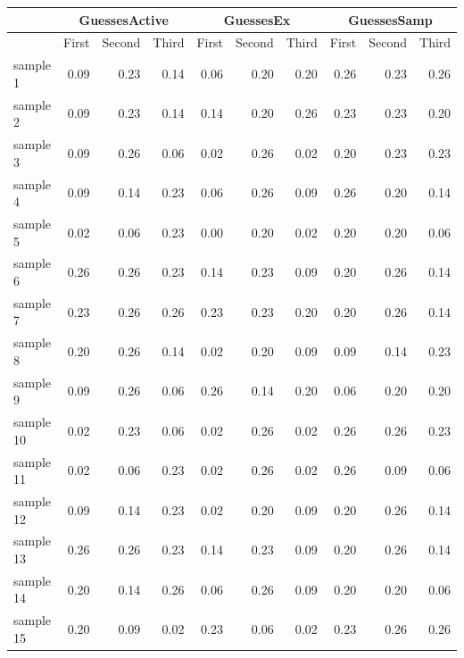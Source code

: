 \begin{table}
\begin{tabular}{|l|rrr|rrr|rrr|}
\toprule
& \multicolumn{3}{c|}{GuessesActive} & \multicolumn{3}{c|}{GuessesEx} & \multicolumn{3}{c|}{GuessesSamp} \\
\midrule
 &             First &     Second &     Third &   First &     Second &     Third &     First &     Second &  Third \\
\midrule
sample 1  &          0.09 &  0.23 &  0.14 &      0.06 &  0.20 &  0.20 &        0.26 &  0.23 &  0.26 \\
sample 2  &          0.09 &  0.23 &  0.14 &      0.14 &  0.20 &  0.26 &        0.23 &  0.23 &  0.20 \\
sample 3  &          0.09 &  0.26 &  0.06 &      0.02 &  0.26 &  0.02 &        0.20 &  0.23 &  0.23 \\
sample 4  &          0.09 &  0.14 &  0.23 &      0.06 &  0.26 &  0.09 &        0.26 &  0.20 &  0.14 \\
sample 5  &          0.02 &  0.06 &  0.23 &      0.00 &  0.20 &  0.02 &        0.20 &  0.20 &  0.06 \\
sample 6  &          0.26 &  0.26 &  0.23 &      0.14 &  0.23 &  0.09 &        0.20 &  0.26 &  0.14 \\
sample 7  &          0.23 &  0.26 &  0.26 &      0.23 &  0.23 &  0.20 &        0.20 &  0.26 &  0.14 \\
sample 8  &          0.20 &  0.26 &  0.14 &      0.02 &  0.20 &  0.09 &        0.09 &  0.14 &  0.23 \\
sample 9  &          0.09 &  0.26 &  0.06 &      0.26 &  0.14 &  0.20 &        0.06 &  0.20 &  0.20 \\
sample 10 &          0.02 &  0.23 &  0.06 &      0.02 &  0.26 &  0.02 &        0.26 &  0.26 &  0.23 \\
sample 11 &          0.02 &  0.06 &  0.23 &      0.02 &  0.26 &  0.02 &        0.26 &  0.09 &  0.06 \\
sample 12 &          0.09 &  0.14 &  0.23 &      0.02 &  0.20 &  0.09 &        0.20 &  0.26 &  0.14 \\
sample 13 &          0.26 &  0.26 &  0.23 &      0.14 &  0.23 &  0.09 &        0.20 &  0.26 &  0.14 \\
sample 14 &          0.20 &  0.14 &  0.26 &      0.06 &  0.26 &  0.09 &        0.20 &  0.20 &  0.06 \\
sample 15 &          0.20 &  0.09 &  0.02 &      0.23 &  0.06 &  0.02 &        0.23 &  0.26 &  0.26 \\

\end{tabular}
\end{table}
